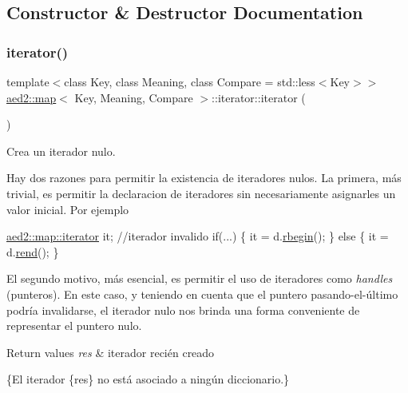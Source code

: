 \subsection{Constructor \& Destructor Documentation}
\mbox{\label{classaed2_1_1map_1_1iterator_acdd790eb54216601a2e0591776004dba}} 
\subsubsection{\texorpdfstring{iterator()}{iterator()}}
{\footnotesize\ttfamily template$<$class Key, class Meaning, class Compare = std\+::less$<$\+Key$>$$>$ \\
\hyperlink{classaed2_1_1map}{aed2\+::map}$<$ Key, Meaning, Compare $>$\+::iterator\+::iterator (\begin{DoxyParamCaption}{ }\end{DoxyParamCaption})\hspace{0.3cm}{\ttfamily [inline]}}



Crea un iterador nulo. 

Hay dos razones para permitir la existencia de iteradores nulos. La primera, más trivial, es permitir la declaracion de iteradores sin necesariamente asignarles un valor inicial. Por ejemplo 
\begin{DoxyCode}
\hyperlink{classaed2_1_1map_1_1iterator}{aed2::map::iterator} it;   \textcolor{comment}{//iterador invalido}
\textcolor{keywordflow}{if}(...) \{
  it = d.\hyperlink{classaed2_1_1map_ac412d3902112122c1bffe2d4283a4e9d}{rbegin}();
\} \textcolor{keywordflow}{else} \{
  it = d.\hyperlink{classaed2_1_1map_a277f03b4f4b6b98879e4e4921081801f}{rend}();
\}
\end{DoxyCode}
 El segundo motivo, más esencial, es permitir el uso de iteradores como {\itshape handles} (punteros). En este caso, y teniendo en cuenta que el puntero pasando-\/el-\/último podría invalidarse, el iterador nulo nos brinda una forma conveniente de representar el puntero nulo.


\begin{DoxyRetVals}{Return values}
{\em res} & iterador recién creado\\
\hline
\end{DoxyRetVals}
\{El iterador \{res\} no está asociado a ningún diccionario.\}

